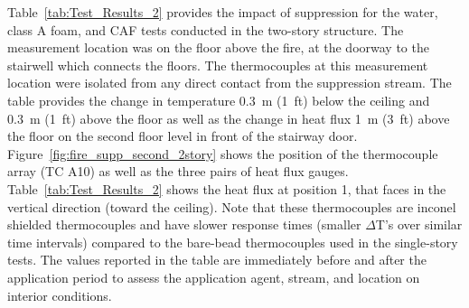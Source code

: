 \documentclass[12pt,oneside]{book}
\begin{document}
Table~\ref{tab:Test_Results_2} provides the impact of suppression for the water, class A foam, and CAF tests conducted in the two-story structure. The measurement location was on the floor above the fire, at the doorway to the stairwell which connects the floors. The thermocouples at this measurement location were isolated from any direct contact from the suppression stream. The table provides the change in temperature 0.3~m (1~ft) below the ceiling and 0.3~m (1~ft) above the floor as well as the change in heat flux 1~m (3~ft) above the floor on the second floor level in front of the stairway door. Figure~\ref{fig:fire_supp_second_2story} shows the position of the thermocouple array (TC A10) as well as the three pairs of heat flux gauges. Table~\ref{tab:Test_Results_2} shows the heat flux at position 1, that faces in the vertical direction (toward the ceiling). Note that these thermocouples are inconel shielded thermocouples and have slower response times (smaller $\Delta$T's over similar time intervals) compared to the bare-bead thermocouples used in the single-story tests. The values reported in the table are immediately before and after the application period to assess the application agent, stream, and location on interior conditions.
\end{document}
